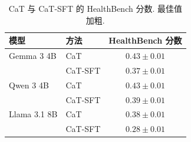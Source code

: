 \begin{longtable}{llc}
\caption{CaT 与 CaT-SFT 的 HealthBench 分数. 最佳值加粗.}\label{cat-tab:healthbench-cat}\\

        \toprule
        模型 & 方法 & HealthBench 分数 \\
        \midrule
        Gemma 3 4B
        & CaT  & $\mathbf{0.43} \pm 0.01$ \\
        & CaT-SFT & $0.37 \pm 0.01$ \\
        \midrule
        Qwen 3 4B
        & CaT  & $\mathbf{0.43} \pm 0.01$ \\
        & CaT-SFT & $0.39 \pm 0.01$ \\
        \midrule
        Llama 3.1 8B
        & CaT  & $\mathbf{0.38} \pm 0.01$ \\
        & CaT-SFT & $0.28 \pm 0.01$ \\
        \bottomrule
    
\end{longtable}
